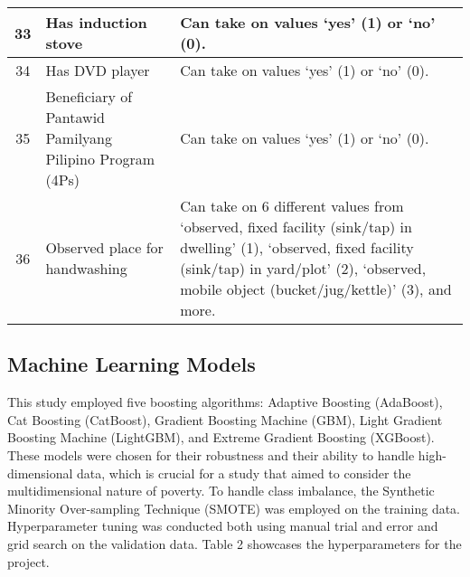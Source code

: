 \documentclass[a4paper,fleqn]{cas-sc}
\begin{document}
\begin{longtable}{c p{5cm} p{9cm}}
    33 & Has induction stove & Can take on values ‘yes’ (1) or ‘no’ (0). \\ \midrule
    34 & Has DVD player & Can take on values ‘yes’ (1) or ‘no’ (0). \\ \midrule
    35 & Beneficiary of Pantawid Pamilyang Pilipino Program (4Ps) & Can take on values ‘yes’ (1) or ‘no’ (0). \\ \midrule
    36 & Observed place for handwashing & Can take on 6 different values from ‘observed, fixed facility (sink/tap) in dwelling’ (1), ‘observed, fixed facility (sink/tap) in yard/plot’ (2), ‘observed, mobile object (bucket/jug/kettle)’ (3), and more. \\ 
\end{longtable}
\endgroup

\subsection{Machine Learning Models}
This study employed five boosting algorithms: Adaptive Boosting (AdaBoost), Cat Boosting (CatBoost), Gradient Boosting Machine (GBM), Light Gradient Boosting Machine (LightGBM), and Extreme Gradient Boosting (XGBoost). These models were chosen for their robustness and their ability to handle high-dimensional data, which is crucial for a study that aimed to consider the multidimensional nature of poverty. To handle class imbalance, the Synthetic Minority Over-sampling Technique (SMOTE) was employed on the training data. Hyperparameter tuning was conducted both using manual trial and error and grid search on the validation data. Table 2 showcases the hyperparameters for the project.
\end{document}
